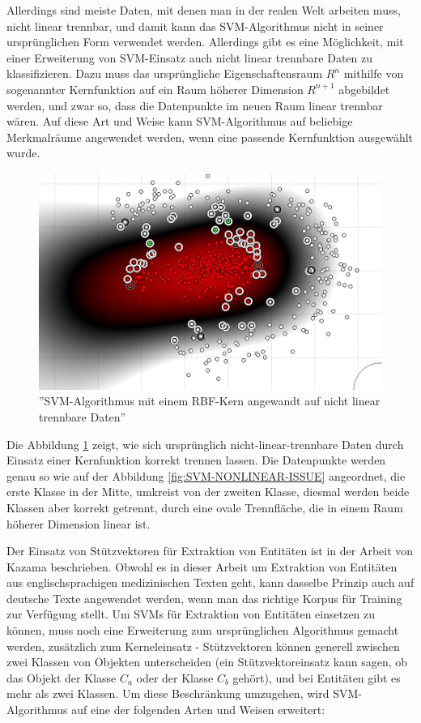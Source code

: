 Allerdings sind meiste Daten, mit denen man in der realen Welt arbeiten muss, nicht linear trennbar, und damit kann das SVM-Algorithmus nicht in seiner ursprünglichen Form verwendet werden. Allerdings gibt es eine Möglichkeit, mit einer Erweiterung von SVM-Einsatz auch nicht linear trennbare Daten zu klassifizieren. Dazu muss das ursprüngliche Eigenschaftensraum $R^n$ mithilfe von sogenannter Kernfunktion auf ein Raum höherer Dimension $R^{n+1}$ abgebildet werden, und zwar so, dass die Datenpunkte im neuen Raum linear trennbar wären\cite{Hearst:98}. Auf diese Art und Weise kann SVM-Algorithmus auf beliebige Merkmalräume angewendet werden, wenn eine passende Kernfunktion ausgewählt wurde\cite{hsu2003practical}.

\begin{figure}
\centering
\includegraphics[width=\textwidth,angle=90]{Bilder/svm-nonlinear-rbf.png}
\caption{''SVM-Algorithmus mit einem RBF-Kern angewandt auf nicht linear trennbare Daten''}
\label{fig:SVM-NONLINEAR-ISSUE-FIXED}
\end{figure}

Die Abbildung \ref{fig:SVM-NONLINEAR-ISSUE-FIXED} zeigt, wie sich ursprünglich nicht-linear-trennbare Daten durch Einsatz einer Kernfunktion korrekt trennen lassen. Die Datenpunkte werden genau so wie auf der Abbildung \ref{fig:SVM-NONLINEAR-ISSUE} angeordnet, die erste Klasse in der Mitte, umkreist von der zweiten Klasse, diesmal werden beide Klassen aber korrekt getrennt, durch eine ovale Trennfläche, die in einem Raum höherer Dimension linear ist.

Der Einsatz von Stützvektoren für Extraktion von Entitäten ist in der Arbeit von Kazama\cite{kazama2002tuning} beschrieben. Obwohl es in dieser Arbeit um Extraktion von Entitäten aus englischsprachigen medizinischen Texten geht, kann dasselbe Prinzip auch auf deutsche Texte angewendet werden, wenn man das richtige Korpus für Training zur Verfügung stellt. Um SVMs für Extraktion von Entitäten einsetzen zu können, muss noch eine Erweiterung zum ursprünglichen Algorithmus gemacht werden, zusätzlich zum Kerneleinsatz - Stützvektoren können generell zwischen zwei Klassen von Objekten unterscheiden (ein Stützvektoreinsatz kann sagen, ob das Objekt der Klasse $C_a$ oder der Klasse $C_b$ gehört), und bei Entitäten gibt es mehr als zwei Klassen. Um diese Beschränkung umzugehen, wird SVM-Algorithmus auf eine der folgenden Arten und Weisen erweitert:

